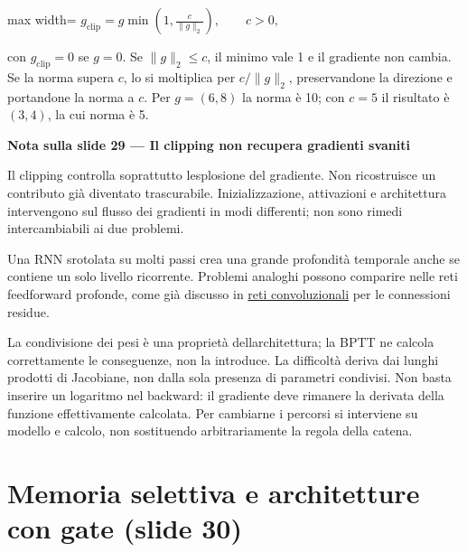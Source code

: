\documentclass[11pt,a4paper,oneside,openany]{book}
\renewenvironment{quote}{\list{}{\leftmargin=1em\rightmargin=0pt}\item\relax}{\endlist}
\begin{document}
\begin{center}
\begin{adjustbox}{max width=\linewidth}
$\displaystyle \boxed{g_{\mathrm{clip}}=g\min\left(1,\frac{c}{\|g\|_2}\right),\qquad c>0,}$
\end{adjustbox}
\end{center}

con \(g_{\mathrm{clip}}=0\) se \(g=0\). Se \(\|g\|_2\leq c\), il minimo vale 1 e il gradiente non cambia. Se la norma supera \(c\), lo si moltiplica per \(c/\|g\|_2\), preservandone la direzione e portandone la norma a \(c\). Per \(g=(6,8)\) la norma è 10; con \(c=5\) il risultato è \((3,4)\), la cui norma è 5.

\begin{quote}
\textbf{Nota sulla slide 29 --- Il clipping non recupera gradienti svaniti}
\end{quote}

\begin{quote}
Il clipping controlla soprattutto l\textquotesingle esplosione del gradiente. Non ricostruisce un contributo già diventato trascurabile. Inizializzazione, attivazioni e architettura intervengono sul flusso dei gradienti in modi differenti; non sono rimedi intercambiabili ai due problemi.
\end{quote}

Una RNN srotolata su molti passi crea una grande profondità temporale anche se contiene un solo livello ricorrente. Problemi analoghi possono comparire nelle reti feedforward profonde, come già discusso in \hyperref[fonte02]{reti convoluzionali} per le connessioni residue.

La condivisione dei pesi è una proprietà dell\textquotesingle architettura; la BPTT ne calcola correttamente le conseguenze, non la introduce. La difficoltà deriva dai lunghi prodotti di Jacobiane, non dalla sola presenza di parametri condivisi. Non basta inserire un logaritmo nel backward: il gradiente deve rimanere la derivata della funzione effettivamente calcolata. Per cambiarne i percorsi si interviene su modello e calcolo, non sostituendo arbitrariamente la regola della catena.

\section{Memoria selettiva e architetture con gate (slide 30)}\label{f03-r638}
\end{document}
